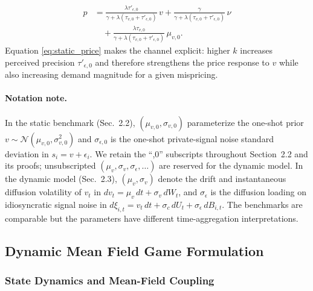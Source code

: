 \begin{equation}
\begin{aligned}
p
&= \frac{\lambda \tau'_{\epsilon,0}}{\gamma + \lambda(\tau_{v,0}+\tau'_{\epsilon,0})}\,v
 + \frac{\gamma}{\gamma + \lambda(\tau_{v,0}+\tau'_{\epsilon,0})}\,\nu\\
&\quad + \frac{\lambda\tau_{v,0}}{\gamma + \lambda(\tau_{v,0}+\tau'_{\epsilon,0})}\,\mu_{v,0}.
\end{aligned}
\label{eq:static_price}
\end{equation}
Equation \eqref{eq:static_price} makes the channel explicit: higher $k$ increases perceived precision $\tau'_{\epsilon,0}$ and therefore strengthens the price response to $v$ while also increasing demand magnitude for a given mispricing.

\paragraph{Notation note.}
In the static benchmark (Sec.~2.2), $(\mu_{v,0},\sigma_{v,0})$ parameterize the one-shot prior $v\sim\mathcal N(\mu_{v,0},\sigma_{v,0}^2)$ and $\sigma_{\epsilon,0}$ is the one-shot private-signal noise standard deviation in $s_i=v+\epsilon_i$. We retain the ``,0'' subscripts throughout Section~2.2 and its proofs; unsubscripted $(\mu_v,\sigma_v,\sigma_\epsilon,\ldots)$ are reserved for the dynamic model. In the dynamic model (Sec.~2.3), $(\mu_v,\sigma_v)$ denote the drift and instantaneous diffusion volatility of $v_t$ in $dv_t=\mu_v\,dt+\sigma_v\,dW_t$, and $\sigma_\epsilon$ is the diffusion loading on idiosyncratic signal noise in $d\xi_{i,t}=v_t\,dt+\sigma_c\,dU_t+\sigma_\epsilon\,dB_{i,t}$. The benchmarks are comparable but the parameters have different time-aggregation interpretations.

\subsection{Dynamic Mean Field Game Formulation}

\subsubsection{State Dynamics and Mean-Field Coupling}

